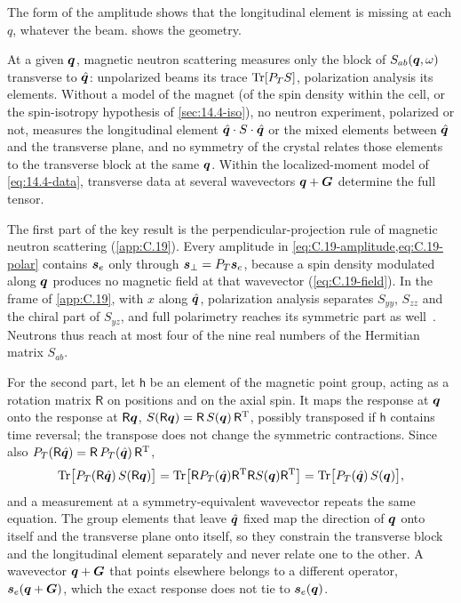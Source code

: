 The form of the amplitude shows that the longitudinal element is missing at each $q$, whatever the beam.  shows the geometry.
\begin{keyresult}
At a given $\bm{q}$, magnetic neutron scattering measures only the block of $S_{ab}(\bm{q},\omega)$ transverse to $\hat{\bm{q}}$: unpolarized beams its trace $\operatorname{Tr}[P_TS]$, polarization analysis its elements. Without a model of the magnet (of the spin density within the cell, or the spin-isotropy hypothesis of \cref{sec:14.4-iso}), no neutron experiment, polarized or not, measures the longitudinal element $\hat{\bm{q}}\cdot S\cdot\hat{\bm{q}}$ or the mixed elements between $\hat{\bm{q}}$ and the transverse plane, and no symmetry of the crystal relates those elements to the transverse block at the same $\bm{q}$. Within the localized-moment model of \cref{eq:14.4-data}, transverse data at several wavevectors $\bm{q} + \bm{G}$ determine the full tensor.
\end{keyresult}
\noindent The first part of the key result is the perpendicular-projection rule of magnetic neutron scattering (\cref{app:C.19}). Every amplitude in \cref{eq:C.19-amplitude,eq:C.19-polar} contains $\bm{s}_e$ only through $\bm{s}_\perp = P_T\bm{s}_e$, because a spin density modulated along $\bm{q}$ produces no magnetic field at that wavevector (\cref{eq:C.19-field}). In the frame of \cref{app:C.19}, with $x$ along $\hat{\bm{q}}$, polarization analysis separates $S_{yy}$, $S_{zz}$ and the chiral part of $S_{yz}$, and full polarimetry reaches its symmetric part as well~\cite{blume1963polarization}. Neutrons thus reach at most four of the nine real numbers of the Hermitian matrix $S_{ab}$.

For the second part, let $\mathsf{h}$ be an element of the magnetic point group, acting as a rotation matrix $\mathsf{R}$ on positions and on the axial spin. It maps the response at $\bm{q}$ onto the response at $\mathsf{R}\bm{q}$, $S(\mathsf{R}\bm{q}) = \mathsf{R}\,S(\bm{q})\,\mathsf{R}^{\mathrm{T}}$, possibly transposed if $\mathsf{h}$ contains time reversal; the transpose does not change the symmetric contractions. Since also $P_T(\mathsf{R}\hat{\bm{q}}) = \mathsf{R}\,P_T(\hat{\bm{q}})\,\mathsf{R}^{\mathrm{T}}$,
\begin{equation*}
  \operatorname{Tr}\bigl[P_T(\mathsf{R}\hat{\bm{q}})\,S(\mathsf{R}\bm{q})\bigr] = \operatorname{Tr}\bigl[\mathsf{R}P_T(\hat{\bm{q}})\mathsf{R}^{\mathrm{T}}\mathsf{R}S(\bm{q})\mathsf{R}^{\mathrm{T}}\bigr] = \operatorname{Tr}\bigl[P_T(\hat{\bm{q}})\,S(\bm{q})\bigr] ,
\end{equation*}
and a measurement at a symmetry-equivalent wavevector repeats the same equation. The group elements that leave $\hat{\bm{q}}$ fixed map the direction of $\bm{q}$ onto itself and the transverse plane onto itself, so they constrain the transverse block and the longitudinal element separately and never relate one to the other. A wavevector $\bm{q} + \bm{G}$ that points elsewhere belongs to a different operator, $\bm{s}_e(\bm{q} + \bm{G})$, which the exact response does not tie to $\bm{s}_e(\bm{q})$.

